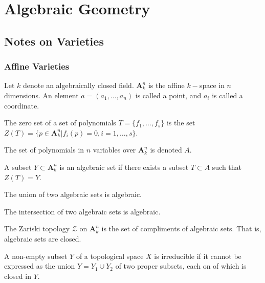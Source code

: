 \documentclass[crop=false,class=article,oneside]{standalone}
\begin{document}
    \ifx\ifsub\undefined
        \section*{Algebraic Geometry}
        \setcounter{section}{1}
    \fi
    \subsection{Notes on Varieties}
        \subsubsection{Affine Varieties}
            Let $k$ denote an algebraically closed field.
            $\textbf{A}_{k}^n$ is the affine $k-$space in
            $n$ dimensions. An element $a=(a_1,\hdots, a_n)$
            is called a point, and $a_i$ is called a coordinate.
            \begin{definition}
                The zero set of a set of polynomials
                $T=\{f_{1},\hdots,f_{s}\}$ is the set
                $Z(T)%
                 =\{p\in\textbf{A}_{k}^{n}|f_{i}(p)=0,%
                    i=1,\hdots,s\}$.
            \end{definition}
            \begin{notation}
                The set of polynomials in $n$ variables
                over $\textbf{A}_{k}^{n}$ is denoted $A$.
            \end{notation}
            \begin{definition}
                A subset $Y\subset\textbf{A}_{k}^{n}$ is an
                algebraic set if there exists a subset
                $T\subset{A}$ such that $Z(T)=Y$.
            \end{definition}
            \begin{theorem}
                The union of two algebraic
                sets is algebraic.
            \end{theorem}
            \begin{theorem}
                The intersection of two algebraic
                sets is algebraic.
            \end{theorem}
            \begin{definition}
                The Zariski topology $\mathcal{Z}$ on
                $\textbf{A}_{k}^{n}$ is the set of compliments
                of algebraic sets. That is,
                algebraic sets are closed.
            \end{definition}
            \begin{definition}
                A non-empty subset $Y$ of a topological space
                $X$ is irreducible if it cannot be expressed
                as the union $Y={Y_{1}}\cup{Y_{2}}$ of
                two proper subsets, each on of which is
                closed in $Y$.
            \end{definition}
\end{document}
